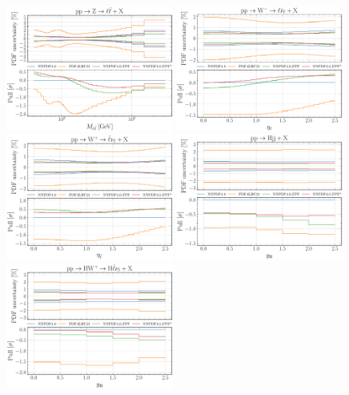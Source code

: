 \begin{figure}[t]
\centering
\includegraphics[width=0.49\textwidth]{plots/LHCpheno/NNPDF_DY_14TEV_40_PHENO-global.pdf}
\includegraphics[width=0.49\textwidth]{plots/LHCpheno/NNPDF_WM_14TEV_40_PHENO-global.pdf}
\includegraphics[width=0.49\textwidth]{plots/LHCpheno/NNPDF_WP_14TEV_40_PHENO-global.pdf}
\includegraphics[width=0.49\textwidth]{plots/LHCpheno/NNPDF_HVBF_14TEV_40_PHENO-global.pdf}
\includegraphics[width=0.49\textwidth]{plots/LHCpheno/NNPDF_HWP_14TEV_40_PHENO-global.pdf}

\end{figure}
